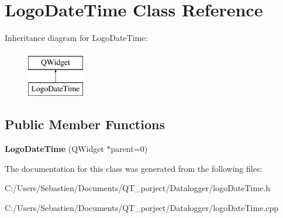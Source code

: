 \hypertarget{class_logo_date_time}{}\section{Logo\+Date\+Time Class Reference}
\label{class_logo_date_time}
Inheritance diagram for Logo\+Date\+Time\+:\begin{figure}[H]
\begin{center}
\leavevmode
\includegraphics[height=2.000000cm]{class_logo_date_time}
\end{center}
\end{figure}
\subsection*{Public Member Functions}
\begin{DoxyCompactItemize}
\item 
\mbox{\label{class_logo_date_time_a26b46fb548f7457b7ba24906b3ed1648}} 
{\bfseries Logo\+Date\+Time} (Q\+Widget $\ast$parent=0)
\end{DoxyCompactItemize}


The documentation for this class was generated from the following files\+:\begin{DoxyCompactItemize}
\item 
C\+:/\+Users/\+Sebastien/\+Documents/\+Q\+T\+\_\+porject/\+Datalogger/logo\+Date\+Time.\+h\item 
C\+:/\+Users/\+Sebastien/\+Documents/\+Q\+T\+\_\+porject/\+Datalogger/logo\+Date\+Time.\+cpp\end{DoxyCompactItemize}
